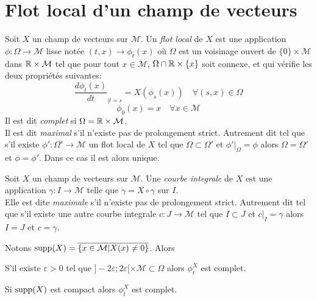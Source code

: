 \documentclass[12pt, a4paper]{book}
\begin{document}
\newpage
\section{Flot local d'un champ de vecteurs}

\begin{defi}
Soit $X$ un champ de vecteurs sur $\mathcal{M}$. Un \emph{flot local} de $X$ est une application $\phi : \Omega \to \mathcal{M}$ lisse notée $(t,x) \to \phi_t(x)$ où $\Omega$ est un voisinage ouvert de $\{0\}\times \mathcal{M}$ dans $\mathbb{R} \times \mathcal{M}$ tel que pour tout $x\in \mathcal{M}$, $\Omega \cap \mathbb{R} \times \{x\}$ soit connexe, et qui vérifie les deux propriétés suivantes: 
$$\frac{d\phi_t(x)}{dt}_{|t=s} = X(\phi_s(x)) \quad \forall (s, x)\in \Omega$$
$$\phi_0(x) = x \quad \forall x\in \mathcal{M}$$
Il est dit \emph{complet} si $\Omega = \mathbb{R} \times \mathcal{M}$. \\
Il est dit \emph{maximal} s'il n'existe pas de prolongement strict. Autrement dit tel que s'il existe $\phi' : \Omega' \to \mathcal{M}$ un flot local de $X$ tel que $\Omega \subset \Omega'$ et $\phi'|_{\Omega} = \phi$ alors $\Omega = \Omega'$ et $\phi = \phi'$. Dans ce cas il est alors unique.
\end{defi}

\begin{defi}
Soit $X$ un champ de vecteurs sur $\mathcal{M}$. Une \emph{courbe integrale} de $X$ est une application $\gamma : I \to \mathcal{M}$ telle que $\dot\gamma = X \circ \gamma$ sur $I$. \\
Elle est dite \emph{maximale} s'il n'existe pas de prolongement strict. Autrement dit tel que s'il existe une autre courbe integrale $c: J \to \mathcal{M}$ tel que $I \subset J$ et $c|_I = \gamma$ alors $I = J$ et $c = \gamma$.
\end{defi}

\begin{pro}
Notons $\operatorname{supp}(X) = \overline{\{x\in \mathcal{M} | X(x) \neq 0\}}$. Alors 
\be
	\item S'il existe $\varepsilon > 0$ tel que $]-2\varepsilon; 2\varepsilon[\times \mathcal{M} \subset \Omega$ alors $\phi_t^X$ est complet.
	\item Si $\operatorname{supp}(X)$ est compact alors $\phi_t^X$ est complet.
\ee
\end{pro}
\end{document}
